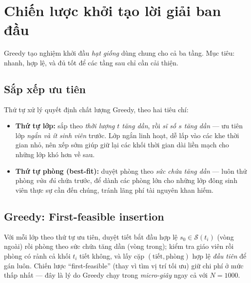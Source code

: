 \section{Chiến lược khởi tạo lời giải ban đầu}
\label{sec:init}

Greedy tạo nghiệm khởi đầu \emph{hạt giống} dùng chung cho cả ba tầng. Mục tiêu:
nhanh, hợp lệ, và đủ tốt để các tầng sau chỉ cần cải thiện.

\subsection{Sắp xếp ưu tiên}
Thứ tự xử lý quyết định chất lượng Greedy, theo hai tiêu chí:
\begin{itemize}
  \item \textbf{Thứ tự lớp:} sắp theo \emph{thời lượng $t$ tăng dần}, rồi \emph{sĩ
  số $s$ tăng dần} --- ưu tiên lớp \emph{ngắn và ít sinh viên} trước. Lớp ngắn linh
  hoạt, dễ lấp vào các khe thời gian nhỏ, nên xếp sớm giúp giữ lại các khối thời
  gian dài liền mạch cho những lớp khó hơn về sau.
  \item \textbf{Thứ tự phòng (best-fit):} duyệt phòng theo \emph{sức chứa tăng dần}
  --- luôn thử phòng \emph{vừa đủ} chứa trước, để dành các phòng lớn cho những lớp
  đông sinh viên thực sự cần đến chúng, tránh lãng phí tài nguyên khan hiếm.
\end{itemize}

\subsection{Greedy: First-feasible insertion}
Với mỗi lớp theo thứ tự ưu tiên, duyệt tiết bắt đầu hợp lệ $s_0\in\mathcal{S}(t_i)$
(vòng ngoài) rồi phòng theo sức chứa tăng dần (vòng trong); kiểm tra giáo viên rồi
phòng có rảnh cả khối $t_i$ tiết không, và lấy cặp $(\text{tiết},\text{phòng})$
hợp lệ \emph{đầu tiên} để gán luôn. Chiến lược ``first-feasible'' (thay vì tìm vị
trí tối ưu) giữ chi phí ở mức thấp nhất --- đây là lý do Greedy chạy trong
\emph{micro-giây} ngay cả với $N=1000$.

